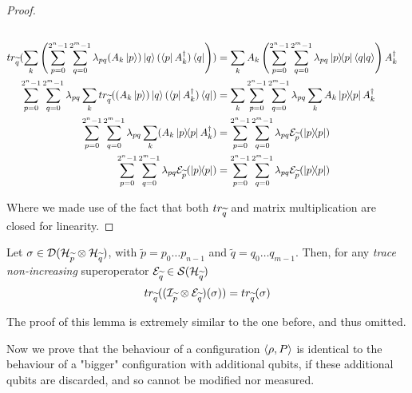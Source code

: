 \begin{proof}
\begin{align*}
\\
\trQ(\sum_k  \left( \sum_{p = 0}^{2^n-1} \sum_{q = 0}^{2^m-1} \lambda_{pq} (A_k\ket{p})\ket{q}(\bra{p}A_k^\dagger) \bra{q} \right) )
&= \sum_k A_k\left( \sum_{p = 0}^{2^n-1} \sum_{q = 0}^{2^m-1} \lambda_{pq} \proj{p}\braket{q | q}\right)A_k^\dagger
\\
\sum_{p = 0}^{2^n-1} \sum_{q = 0}^{2^m-1} \lambda_{pq} \sum_k \trQ( (A_k\ket{p})\ket{q}(\bra{p}A_k^\dagger) \bra{q} ) 
&= \sum_k  \sum_{p = 0}^{2^n-1} \sum_{q = 0}^{2^m-1} \lambda_{pq} \sum_k  A_k \proj{p} A_k^\dagger 
\\
\sum_{p = 0}^{2^n-1} \sum_{q = 0}^{2^m-1} \lambda_{pq} \sum_k (A_k \proj{p} A_k^\dagger) 
&=  \sum_{p = 0}^{2^n-1} \sum_{q = 0}^{2^m-1} \lambda_{pq} \sop_{\widetilde{p}} (\proj{p})
\\
\sum_{p = 0}^{2^n-1} \sum_{q = 0}^{2^m-1} \lambda_{pq} \sop_{\widetilde{p}}(\proj{p})
&=  \sum_{p = 0}^{2^n-1} \sum_{q = 0}^{2^m-1} \lambda_{pq} \sop_{\widetilde{p}} (\proj{p})
\end{align*}

Where we made use of the fact that both $tr_{\widetilde{q}}$ and matrix multiplication are closed for linearity.
\end{proof}

\begin{lemma}\label{trace_and_sop_2}
Let $\sigma \in  \mathcal{D}(\mathcal{H}_{\widetilde{p}} \otimes \mathcal{H}_{\widetilde{q}})$, with $\widetilde{p} = p_0 \ldots p_{n-1}$ and $\widetilde{q} = q_0 \ldots q_{m-1}$. Then, for any \textit{trace non-increasing} superoperator $\mathcal{E}_{\widetilde{q}} \in \mathcal{S}(\mathcal{H}_{\widetilde{q}})$
\[ tr_{\widetilde{q}}((\mathcal{I}_{\widetilde{p}} \otimes \mathcal{E}_{\widetilde{q}})(\sigma)) = tr_{\widetilde{q}}(\sigma)
\]
\end{lemma}

The proof of this lemma is extremely similar to the one before, and thus omitted. 

Now we prove that the behaviour of a configuration $\langle\rho, P\rangle$ is identical to the behaviour of a "bigger" configuration with additional qubits, if these additional qubits are discarded, and so cannot be modified nor measured.

